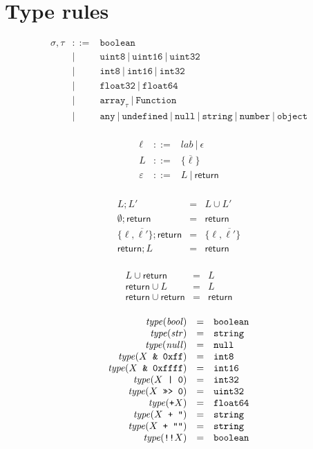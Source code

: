 \documentclass{article}
\newcommand{\type}{\mathit{type}}
\newcommand{\seq}[1]{\overline{{#1}}}
\newcommand{\mathjs}[1]{\mbox{\texttt{{#1}}}}
\newcommand{\boolean}{\mathtt{boolean}}
\newcommand{\uintone}{\mathtt{uint8}}
\newcommand{\uinttwo}{\mathtt{uint16}}
\newcommand{\uintfour}{\mathtt{uint32}}
\newcommand{\intone}{\mathtt{int8}}
\newcommand{\inttwo}{\mathtt{int16}}
\newcommand{\intfour}{\mathtt{int32}}
\newcommand{\float}{\mathtt{float32}}
\newcommand{\double}{\mathtt{float64}}
\newcommand{\arr}[1]{\mathtt{array}_{#1}}
\newcommand{\Fun}{\mathtt{Function}}
\newcommand{\any}{\mathtt{any}}
\newcommand{\str}{\mathtt{string}}
\newcommand{\undef}{\mathtt{undefined}}
\newcommand{\nul}{\mathtt{null}}
\newcommand{\num}{\mathtt{number}}
\newcommand{\obj}{\mathtt{object}}
\newcommand{\mustret}{\mathsf{return}}
\newcommand{\seqcomp}{\mathrel{;}}
\begin{document}
\section{Type rules}

\[
\begin{array}{rcl}
\sigma, \tau & ::= & \boolean \\
             &  |  & \uintone ~|~ \uinttwo ~|~ \uintfour \\
             &  |  & \intone ~|~ \inttwo ~|~ \intfour \\
             &  |  & \float ~|~ \double \\
             &  |  & \arr{\tau} ~|~ \Fun \\
             &  |  & \any ~|~ \undef ~|~ \nul ~|~ \str ~|~ \num ~|~ \obj \\
\end{array}
\]

\[
\begin{array}{rcl}
\ell        & ::= & \mathit{lab} ~|~ \epsilon \\
L           & ::= & \{ \seq{\ell} \} \\
\varepsilon & ::= & L ~|~ \mustret \\
\end{array}
\]

\[
\begin{array}{rcl}
L                       \seqcomp L'       & = & L \cup L' \\
\emptyset               \seqcomp \mustret & = & \mustret \\
\{ \ell, \seq{\ell'} \} \seqcomp \mustret & = & \{ \ell, \seq{\ell'} \} \\
\mustret                \seqcomp L        & = & \mustret \\
\end{array}
\]

\[
\begin{array}{rcl}
L        \cup \mustret & = & L \\
\mustret \cup L        & = & L \\
\mustret \cup \mustret & = & \mustret \\
\end{array}
\]

\[
\begin{array}{rcl}
\type(\mathit{bool}) & = & \boolean \\
\type(\mathit{str}) & = & \str \\
\type(\mathit{null}) & = & \nul \\
\type(X \mathjs{ \& 0xff}) & = & \intone \\
\type(X \mathjs{ \& 0xffff}) & = & \inttwo \\
\type(X \mathjs{ | 0}) & = & \intfour \\
\type(X \mathjs{ >>> 0}) & = & \uintfour \\
\type(\mathjs{+}X) & = & \double \\
\type(X \mathjs{ + ''}) & = & \str \\
\type(X \mathjs{ + ""}) & = & \str \\
\type(\mathjs{!!}X) & = & \boolean \\
\end{array}
\]
\end{document}
